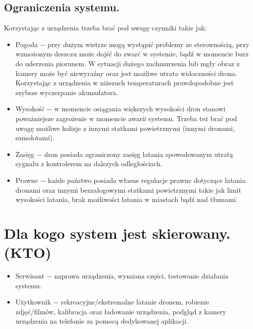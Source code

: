 \documentclass[12pt]{article}
\begin{document}
\subsection{Ograniczenia systemu.}
Korzystając z urządzenia trzeba brać pod uwagę czynniki takie jak: 
\begin{itemize}
    \item Pogoda $-$ przy dużym wietrze mogą wystąpić problemy ze sterownością, przy wzmożonym deszczu może dojść do zwarć w systemie, bądź w momencie burz do uderzenia piorunem. W sytuacji dużego zachmurzenia lub mgły obraz z kamery może być niewyraźny oraz jest możliwe utrata widoczności drona. Korzystając z urządzenia w niższuch temperaturach prawdopodobne jest szybsze wyczerpanie akumulatora. 
    \item Wysokość $-$ w momencie osiągania większych wysokości dron stanowi poważniejsze zagrożenie w momencie awarii systemu. Trzeba też brać pod uwagę możliwe kolizje z innymi statkami powietrznymi (innymi dronami, samolotami).
    \item Zasięg $-$ dron posiada ograniczony zasięg latania spowodowanym utratą sygnału z kontrolerem na dalszych odległościach.
    \item Prawne $-$ każde państwo posiada własne regulacje prawne dotyczące latania dronami oraz innymi bezzałogowymi statkami powietrznymi takie jak limit wysokości latania, brak możliwości latania w miastach bądź nad tłumami.
\end{itemize}

\section{Dla kogo system jest skierowany. (KTO)}
\begin{itemize}
    \item Serwisant $-$ naprawa urządzenia, wymiana części, testowanie działania systemu.
    \item Użytkownik $-$ rekreacyjne/ekstremalne latanie dronem, robienie zdjęć/filmów, kalibracja oraz ładowanie urządzenia, podgląd z kamery urządzenia na telefonie za pomocą dedykowanej aplikacji.  
\end{itemize}
\end{document}
